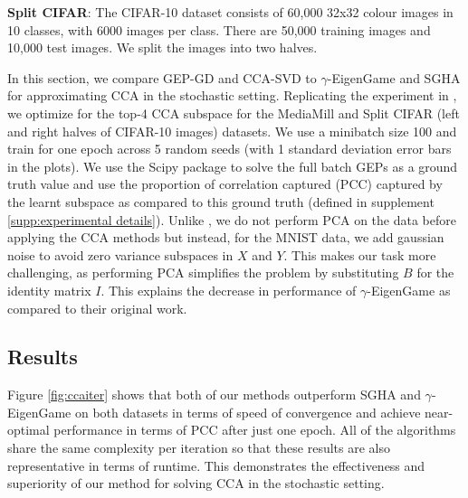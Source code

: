 \textbf{Split CIFAR}: The CIFAR-10 dataset \citep{krizhevsky2009learning} consists of 60,000 32x32 colour images in 10
classes, with 6000 images per class. There are 50,000 training images and 10,000 test images. We split the images into two halves.

In this section, we compare GEP-GD and CCA-SVD to $\gamma$-EigenGame \citep{gemp2022generalized} and SGHA \citep{chen2019constrained} for approximating CCA in the stochastic setting. Replicating the experiment in \citep{meng2021online, gemp2022generalized}, we optimize for the top-4 CCA subspace for the MediaMill and Split CIFAR (left and right halves of CIFAR-10 images) datasets. We use a minibatch size 100 and train for one epoch across 5 random seeds (with 1 standard deviation error bars in the plots). We use the Scipy \citep{virtanen2020scipy} package to solve the full batch GEPs as a ground truth value and use the proportion of correlation captured (PCC) captured by the learnt subspace as compared to this ground truth (defined in supplement \ref{supp:experimental details}). Unlike \citep{gemp2022generalized}, we do not perform PCA on the data before applying the CCA methods but instead, for the MNIST data, we add gaussian noise to avoid zero variance subspaces in $X$ and $Y$. This makes our task more challenging, as performing PCA simplifies the problem by substituting $B$ for the identity matrix $I$. This explains the decrease in performance of $\gamma$-EigenGame as compared to their original work.


\subsection{Results}

Figure \ref{fig:ccaiter} shows that both of our methods outperform SGHA and $\gamma$-EigenGame on both datasets in terms of speed of convergence and achieve near-optimal performance in terms of PCC after just one epoch. All of the algorithms share the same complexity per iteration so that these results are also representative in terms of runtime. This demonstrates the effectiveness and superiority of our method for solving CCA in the stochastic setting.

